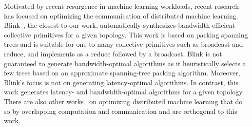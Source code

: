 Motivated by recent resurgence in machine-learning workloads, recent
research has focused on optimizing the communication of distributed
machine learning. Blink~\cite{wang2020blink}, the closest to our work,
automatically synthesizes bandwidth-efficient collective primitives
for a given topology. This work is based on packing spanning trees and
is suitable for one-to-many collective primitives such as broadcast
and reduce, and implements \allreduce as a reduce followed by a
broadcast. Blink is not guaranteed to generate bandwidth-optimal
algorithms as it heuristically selects a few trees based on an
approximate spanning-tree packing algorithm. Moreover, Blink's focus
is not on generating latency-optimal algorithms. In contrast, this
work generates latency- and bandwidth-optimal algorithms for a given
topology. There are also other
works~\cite{zhang2017poseidon,hashemi2019tictac,jayarajan2019priority,peng2019generic}
on optimizing distributed machine learning that do so by overlapping
computation and communication and are orthogonal to this work.



